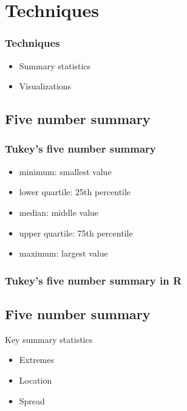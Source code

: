 \documentclass{beamer}
\begin{document}
\section{Techniques}
\begin{frame}

\frametitle{Techniques}
\begin{itemize}
\item Summary statistics
\item Visualizations
\end{itemize}

\end{frame}




\subsection{Five number summary}
\begin{frame}

\frametitle{Tukey's five number summary}

\begin{itemize}
\item minimum: smallest value
\item lower quartile: 25th percentile
\item median: middle value
\item upper quartile: 75th percentile
\item maximum: largest value
\end{itemize}

\end{frame}



\begin{frame}[fragile]
\frametitle{Tukey's five number summary in R}

\end{frame}



\begin{frame}

\end{frame}


\subsection{Five number summary}
\begin{frame}

Key summary statistics 
\begin{itemize}
\item Extremes
\item Location
\item Spread
\end{itemize}

\end{frame}
\end{document}
